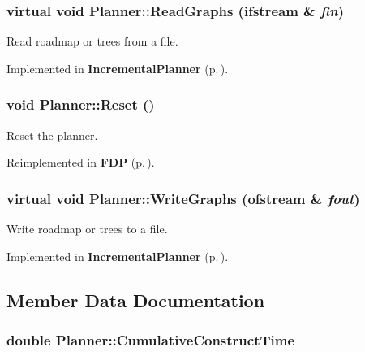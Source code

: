 \subsubsection{\setlength{\rightskip}{0pt plus 5cm}virtual void Planner::Read\-Graphs (ifstream \& {\em fin})\hspace{0.3cm}{\tt  [pure virtual]}}\label{classPlanner_a6}


Read roadmap or trees from a file.



Implemented in {\bf Incremental\-Planner} {\rm (p.\,\pageref{classIncrementalPlanner_a6})}.
\subsubsection{\setlength{\rightskip}{0pt plus 5cm}void Planner::Reset ()}\label{classPlanner_a2}


Reset the planner.



Reimplemented in {\bf FDP} {\rm (p.\,\pageref{classFDP_a2})}.
\subsubsection{\setlength{\rightskip}{0pt plus 5cm}virtual void Planner::Write\-Graphs (ofstream \& {\em fout})\hspace{0.3cm}{\tt  [pure virtual]}}\label{classPlanner_a5}


Write roadmap or trees to a file.



Implemented in {\bf Incremental\-Planner} {\rm (p.\,\pageref{classIncrementalPlanner_a5})}.

\subsection{Member Data Documentation}
\subsubsection{\setlength{\rightskip}{0pt plus 5cm}double Planner::Cumulative\-Construct\-Time}\label{classPlanner_m1}



